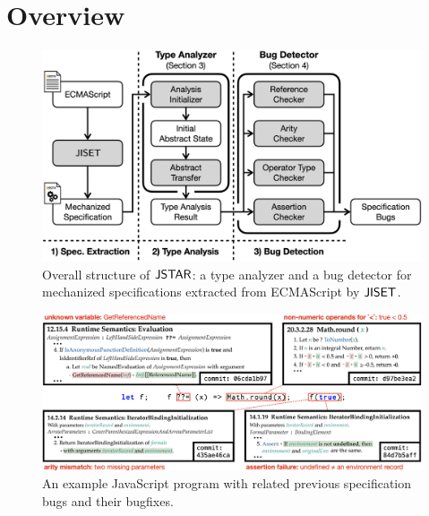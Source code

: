 \section{Overview}\label{sec:overview}

\begin{figure}
  \centering
  \includegraphics[width=\columnwidth]{img/overall}
  \caption{Overall structure of $\tool$: a type analyzer and a bug detector for
  mechanized specifications extracted from ECMAScript by $\jiset$.}
  \label{fig:overall}
  \vspace*{-1.5em}
\end{figure}

\begin{figure}[t]
  \centering
  \includegraphics[width=\textwidth]{img/example}
  \vspace*{-1.5em}
  \caption{An example JavaScript program with related previous specification
  bugs and their bugfixes.}
  \label{fig:example}
  \vspace*{-1.5em}
\end{figure}

